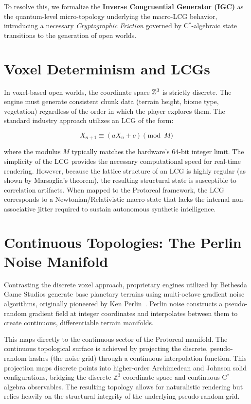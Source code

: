 To resolve this, we formalize the \textbf{Inverse Congruential Generator (IGC)} as the quantum-level micro-topology underlying the macro-LCG behavior, introducing a necessary \textit{Cryptographic Friction} governed by C$^*$-algebraic state transitions to the generation of open worlds.

\section{Voxel Determinism and LCGs}

In voxel-based open worlds, the coordinate space $\mathbb{Z}^3$ is strictly discrete. The engine must generate consistent chunk data (terrain height, biome type, vegetation) regardless of the order in which the player explores them. The standard industry approach utilizes an LCG of the form:

\[
X_{n+1} \equiv (a X_n + c) \pmod{M}
\]

where the modulus $M$ typically matches the hardware's 64-bit integer limit. The simplicity of the LCG provides the necessary computational speed for real-time rendering. However, because the lattice structure of an LCG is highly regular (as shown by Marsaglia's theorem), the resulting structural state is susceptible to correlation artifacts. When mapped to the Protoreal framework, the LCG corresponds to a Newtonian/Relativistic macro-state that lacks the internal non-associative jitter required to sustain autonomous synthetic intelligence.

\section{Continuous Topologies: The Perlin Noise Manifold}

Contrasting the discrete voxel approach, proprietary engines utilized by Bethesda Game Studios generate base planetary terrains using multi-octave gradient noise algorithms, originally pioneered by Ken Perlin~\cite{perlin1985image}. Perlin noise constructs a pseudo-random gradient field at integer coordinates and interpolates between them to create continuous, differentiable terrain manifolds.

This maps directly to the continuous sector of the Protoreal manifold. The continuous topological surface is achieved by projecting the discrete, pseudo-random hashes (the noise grid) through a continuous interpolation function. This projection maps discrete points into higher-order Archimedean and Johnson solid configurations, bridging the discrete $\mathbb{Z}^3$ coordinate space and continuous C$^*$-algebra observables. The resulting topology allows for naturalistic rendering but relies heavily on the structural integrity of the underlying pseudo-random grid.

